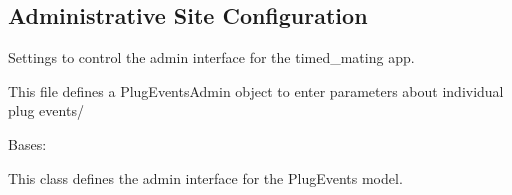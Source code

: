 \documentclass[letterpaper,10pt,english]{sphinxmanual}
\begin{document}
\begin{fulllineitems}
\label{api:timed_mating.urls.delete_plugevents}
\end{fulllineitems}



\begin{fulllineitems}
\label{api:timed_mating.urls.limited_object_detail}
\end{fulllineitems}



\begin{fulllineitems}
\label{api:timed_mating.urls.limited_object_list}
\end{fulllineitems}



\subsection{Administrative Site Configuration}
\label{api:id9}\label{api:module-timed_mating.admin}
Settings to control the admin interface for the timed\_mating app.

This file defines a PlugEventsAdmin object to enter parameters about individual plug events/


\begin{fulllineitems}
\label{api:timed_mating.admin.PlugEventsAdmin}
Bases: 

This class defines the admin interface for the PlugEvents model.


\begin{fulllineitems}
\label{api:timed_mating.admin.PlugEventsAdmin.media}
\end{fulllineitems}


\end{fulllineitems}
\end{document}
